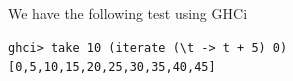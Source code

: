 We have the following test using GHCi
\begin{lstlisting}
ghci> take 10 (iterate (\t -> t + 5) 0)
[0,5,10,15,20,25,30,35,40,45]
\end{lstlisting}
